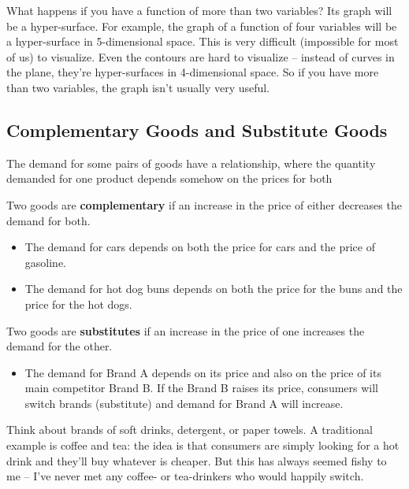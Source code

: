 What happens if you have a function of more than two variables? Its graph will be a hyper-surface. For example, the graph of a function of four variables will be a hyper-surface in 5-dimensional space. This is very difficult (impossible for most of us) to visualize. Even the contours are hard to visualize -- instead of curves in the plane, they’re hyper-surfaces in 4-dimensional space. So if you have more than two variables, the graph isn't usually very useful.

\subsection{Complementary Goods and Substitute Goods}
The demand for some pairs of goods have a relationship, where the quantity demanded for one product depends somehow on the prices for both
\begin{definition}
Two goods are {\bf complementary} if an increase in the price of either decreases the demand for both.
\end{definition}

\begin{example}
\begin{itemize}
  \item The demand for cars depends on both the price for cars and the price of gasoline.
  \item The demand for hot dog buns depends on both the price for the buns and the price for the hot dogs.
\end{itemize}
\end{example}

\begin{definition}
Two goods are {\bf substitutes} if an increase in the price of one increases the demand for the other.
\end{definition}

\begin{example}
\begin{itemize}
  \item The demand for Brand A depends on its price and also on the price of its main competitor Brand B. If the Brand B raises its price, consumers will switch brands (substitute) and demand for Brand A will increase.
\end{itemize}
\end{example}
Think about brands of soft drinks, detergent, or paper towels. A traditional example is coffee and tea: the idea is that consumers are simply looking for a hot drink and they'll buy whatever is cheaper. But this has always seemed fishy to me -- I've never met any coffee- or tea-drinkers who would happily switch.

